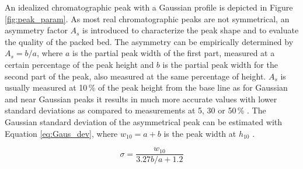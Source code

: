 An idealized chromatographic peak with a Gaussian profile is depicted in Figure\,\ref{fig:peak_param}. As most real chromatographic peaks are not symmetrical, an asymmetry factor $A_{s}$ is introduced to characterize the peak shape and to evaluate the quality of the packed bed. The asymmetry can be empirically determined by $A_{s}=b/a$, where $a$ is the partial peak width of the first part, measured at a certain percentage of the peak height and $b$ is the partial peak width for the second part of the peak, also measured at the same percentage of height. $A_{s}$ is usually measured at 10\,\% of the peak height from the base line as for Gaussian and near Gaussian peaks it results in much more accurate values with lower standard deviations as compared to measurements at 5, 30 or 50\,\% \cite{foley1983equations}. The Gaussian standard deviation of the asymmetrical peak can be estimated with Equation \ref{eq:Gaus_dev}, where $w_{10}=a+b$ is the peak width at $h_{10}$ \cite{papai2002analysis}.  

\begin{equation}
\sigma=\frac{w_{10}}{3.27 b/a + 1.2}
\label{eq:Gaus_dev}
\end{equation}

